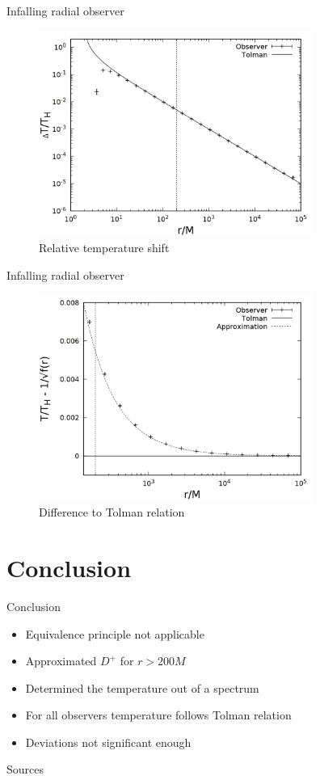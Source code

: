 \documentclass{beamer}
\begin{document}
\begin{frame}{Infalling radial observer}
\begin{figure}
	\centering
    \includegraphics[width=9cm]{../cpp/final/rad.png}
    \caption{Relative temperature shift}
\end{figure}
\end{frame}

\begin{frame}{Infalling radial observer}
\begin{figure}
	\centering
    \includegraphics[width=9cm]{../cpp/final/rad_tolman_error.png}
    \caption{Difference to Tolman relation}
\end{figure}
\end{frame}

\section{Conclusion}
\begin{frame}{Conclusion}
\begin{itemize}
	\item Equivalence principle not applicable
	\item Approximated \(D^+\) for \(r > 200M\)
	\item Determined the temperature out of a spectrum
	\item For all observers temperature follows Tolman relation
	\item Deviations not significant enough
\end{itemize}
\end{frame}

\begin{frame}
\maketitle
\end{frame}

\begin{frame}{Sources}
\printbibliography
\end{frame}

\begin{frame}
\end{frame}
\end{document}
